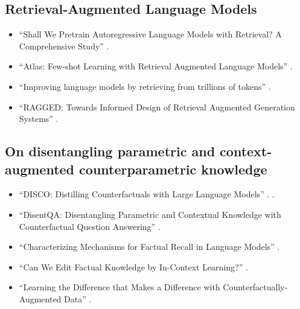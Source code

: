 \subsection{Retrieval-Augmented Language Models}
\begin{itemize}
	\item ``Shall We Pretrain Autoregressive Language Models with Retrieval? A Comprehensive Study'' \citep{shall_we_pretrain_autoregressive}.
	\item ``Atlas: Few-shot Learning with Retrieval Augmented Language Models'' \citep{atlas_foundational}.
	\item ``Improving language models by retrieving from trillions of tokens'' \citep{retro}.
	\item ``RAGGED: Towards Informed Design of Retrieval Augmented Generation Systems'' \citep{ragged}.
\end{itemize}

\subsection{On disentangling parametric and context-augmented counterparametric knowledge}
\begin{itemize}
	\item ``DISCO: Distilling Counterfactuals with Large Language Models'' \citep{disco}.
		.
	\item ``DisentQA: Disentangling Parametric and Contextual Knowledge with Counterfactual Question Answering'' \citep{disentqa}.
	\item ``Characterizing Mechanisms for Factual Recall in Language Models'' \citep{factual_recall}.
	\item ``Can We Edit Factual Knowledge by In-Context Learning?'' \citep{can_we_edit_factual_knowledge}.
	\item ``Learning the Difference that Makes a Difference with Counterfactually-Augmented Data'' \citep{learning_the_difference}.
\end{itemize}

